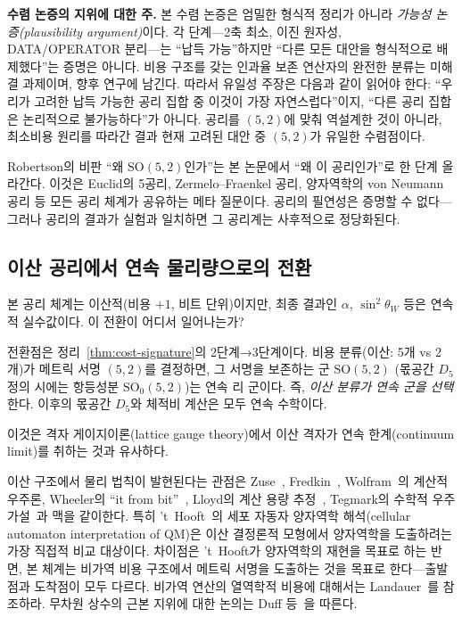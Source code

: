 \documentclass[entropy,article,submit,pdftex,oneauthor]{Definitions/mdpi}
\begin{document}
\textbf{수렴 논증의 지위에 대한 주.} 본 수렴 논증은 엄밀한 형식적 정리가 아니라 \emph{가능성 논증(plausibility argument)}이다. 각 단계---2축 최소, 이진 원자성, DATA/OPERATOR 분리---는 ``납득 가능''하지만 ``다른 모든 대안을 형식적으로 배제했다''는 증명은 아니다. 비용 구조를 갖는 인과율 보존 연산자의 완전한 분류는 미해결 과제이며, 향후 연구에 남긴다. 따라서 유일성 주장은 다음과 같이 읽어야 한다: ``우리가 고려한 납득 가능한 공리 집합 중 이것이 가장 자연스럽다''이지, ``다른 공리 집합은 논리적으로 불가능하다''가 아니다. 공리를 $(5,2)$에 맞춰 역설계한 것이 아니라, 최소비용 원리를 따라간 결과 현재 고려된 대안 중 $(5,2)$가 유일한 수렴점이다.

Robertson의 비판 ``왜 $\mathrm{SO}(5,2)$인가''는 본 논문에서 ``왜 이 공리인가''로 한 단계 올라간다. 이것은 Euclid의 5공리, Zermelo--Fraenkel 공리, 양자역학의 von Neumann 공리 등 모든 공리 체계가 공유하는 메타 질문이다. 공리의 필연성은 증명할 수 없다---그러나 공리의 결과가 실험과 일치하면 그 공리계는 사후적으로 정당화된다.

\subsection{이산 공리에서 연속 물리량으로의 전환}

본 공리 체계는 이산적(비용 $+1$, 비트 단위)이지만, 최종 결과인 $\alpha$, $\sin^2\theta_W$ 등은 연속적 실수값이다. 이 전환이 어디서 일어나는가?

전환점은 정리~\ref{thm:cost-signature}의 2단계→3단계이다. 비용 분류(이산: 5개 vs 2개)가 메트릭 서명 $(5,2)$를 결정하면, 그 서명을 보존하는 군 $\mathrm{SO}(5,2)$ (몫공간 $D_5$ 정의 시에는 항등성분 $\mathrm{SO}_0(5,2)$)는 연속 리 군이다. 즉, \emph{이산 분류가 연속 군을 선택}한다. 이후의 몫공간 $D_5$와 체적비 계산은 모두 연속 수학이다.

이것은 격자 게이지이론(lattice gauge theory)에서 이산 격자가 연속 한계(continuum limit)를 취하는 것과 유사하다.

이산 구조에서 물리 법칙이 발현된다는 관점은 Zuse~\cite{zuse1969}, Fredkin~\cite{fredkin2003}, Wolfram~\cite{wolfram2002}의 계산적 우주론, Wheeler의 ``it from bit''~\cite{wheeler1990}, Lloyd의 계산 용량 추정~\cite{lloyd2002}, Tegmark의 수학적 우주 가설~\cite{tegmark2008}과 맥을 같이한다. 특히 't~Hooft~\cite{thooft2016}의 세포 자동자 양자역학 해석(cellular automaton interpretation of QM)은 이산 결정론적 모형에서 양자역학을 도출하려는 가장 직접적 비교 대상이다. 차이점은 't~Hooft가 양자역학의 재현을 목표로 하는 반면, 본 체계는 비가역 비용 구조에서 메트릭 서명을 도출하는 것을 목표로 한다---출발점과 도착점이 모두 다르다. 비가역 연산의 열역학적 비용에 대해서는 Landauer~\cite{landauer1961}를 참조하라. 무차원 상수의 근본 지위에 대한 논의는 Duff 등~\cite{duff2002}을 따른다.
\end{document}
